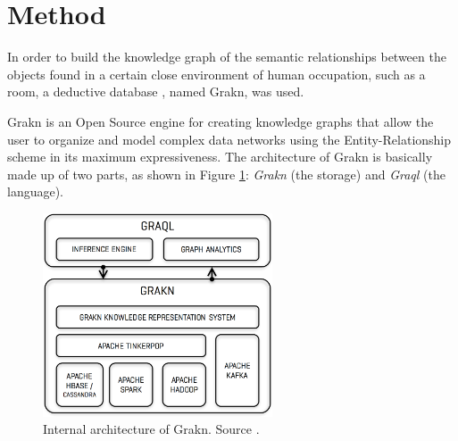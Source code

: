 \section{Method}
\label{sec:metodo}

In order to build the knowledge graph of the semantic relationships between 
the objects found in a certain close environment of human occupation, such as 
a room, a deductive database \cite{stichbury}, named Grakn, was used.

Grakn is an Open Source engine for creating knowledge graphs that allow the 
user to organize and model complex data networks using the Entity-Relationship 
scheme in its maximum expressiveness. The architecture of Grakn is basically 
made up of two parts, as shown in Figure \ref{fig:arch}: \textit{Grakn} 
(the storage) and \textit{Graql} (the language).

\begin{figure}[H]
    \centering
    \includegraphics[width=6.8cm]{figures/architecture}
    \caption{Internal architecture of Grakn.
    Source \cite{stichbury}.}
    \label{fig:arch}
\end{figure}

